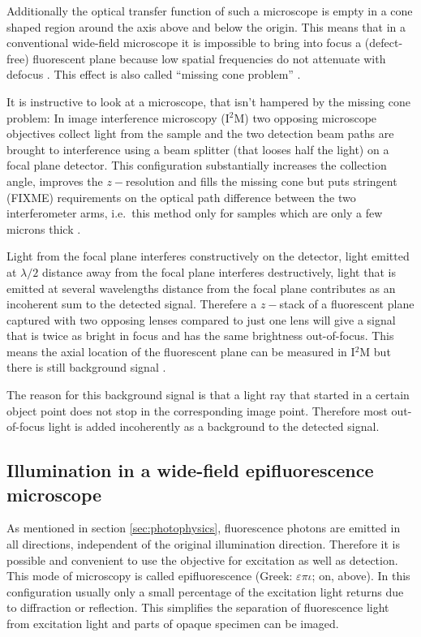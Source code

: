 Additionally the optical transfer function of such a microscope is
empty in a cone shaped region around the axis above and below the
origin.  This means that in a conventional wide-field microscope it is
impossible to bring into focus a (defect-free) fluorescent plane
because low spatial frequencies do not attenuate with defocus
\citep{Neil1997}. This effect is also called ``missing cone problem''
\citep{Streibl1984}.

It is instructive to look at a microscope, that isn't hampered by the
missing cone problem: In image interference microscopy (I${}^2$M) two
opposing microscope objectives collect light from the sample and the
two detection beam paths are brought to interference using a beam
splitter (that looses half the light) on a focal plane detector. This
configuration substantially increases the collection angle, improves
the $z-$resolution and fills the missing cone but puts stringent
(FIXME) requirements on the optical path difference between the two
interferometer arms, i.e.\ this method only for samples which are only
a few microns thick \citep{Gustafsson1999}.

Light from the focal plane interferes constructively on the detector,
light emitted at $\lambda/2$ distance away from the focal plane
interferes destructively, light that is emitted at several wavelengths
distance from the focal plane contributes as an incoherent sum to the
detected signal. Therefere a $z-$stack of a fluorescent plane captured
with two opposing lenses compared to just one lens will give a signal
that is twice as bright in focus and has the same brightness
out-of-focus. This means the axial location of the fluorescent plane
can be measured in I${}^2$M but there is still background signal
\citep{Gustafsson1995}.

The reason for this background signal is that a light ray that started
in a certain object point does not stop in the corresponding image
point. Therefore most out-of-focus light is added incoherently as a
background to the detected signal.


\subsection{Illumination in a wide-field epifluorescence microscope}
As mentioned in section \ref{sec:photophysics}, fluorescence photons
are emitted in all directions, independent of the original
illumination direction. Therefore it is possible and convenient to use
the objective for excitation as well as detection. This mode of
microscopy is called epifluorescence (Greek: $\varepsilon\pi\iota$;
on, above).  In this configuration usually only a small percentage of
the excitation light returns due to diffraction or reflection. This
simplifies the separation of fluorescence light from excitation light
and parts of opaque specimen can be imaged.


